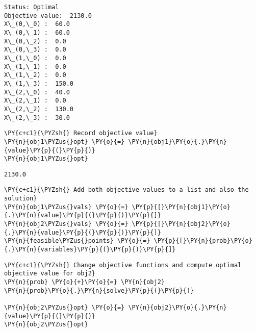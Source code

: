     \begin{Verbatim}[commandchars=\\\{\}]
Status: Optimal
Objective value:  2130.0
X\_(0,\_0) :  60.0
X\_(0,\_1) :  60.0
X\_(0,\_2) :  0.0
X\_(0,\_3) :  0.0
X\_(1,\_0) :  0.0
X\_(1,\_1) :  0.0
X\_(1,\_2) :  0.0
X\_(1,\_3) :  150.0
X\_(2,\_0) :  40.0
X\_(2,\_1) :  0.0
X\_(2,\_2) :  130.0
X\_(2,\_3) :  30.0
    \end{Verbatim}

    \begin{tcolorbox}[breakable, size=fbox, boxrule=1pt, pad at break*=1mm,colback=cellbackground, colframe=cellborder]
\begin{Verbatim}[commandchars=\\\{\}]
\PY{c+c1}{\PYZsh{} Record objective value}
\PY{n}{obj1\PYZus{}opt} \PY{o}{=} \PY{n}{obj1}\PY{o}{.}\PY{n}{value}\PY{p}{(}\PY{p}{)}
\PY{n}{obj1\PYZus{}opt}
\end{Verbatim}
\end{tcolorbox}

            \begin{tcolorbox}[breakable, size=fbox, boxrule=.5pt, pad at break*=1mm, opacityfill=0]
\begin{Verbatim}[commandchars=\\\{\}]
2130.0
\end{Verbatim}
\end{tcolorbox}
        
    \begin{tcolorbox}[breakable, size=fbox, boxrule=1pt, pad at break*=1mm,colback=cellbackground, colframe=cellborder]
\begin{Verbatim}[commandchars=\\\{\}]
\PY{c+c1}{\PYZsh{} Add both objective values to a list and also the solution}
\PY{n}{obj1\PYZus{}vals} \PY{o}{=} \PY{p}{[}\PY{n}{obj1}\PY{o}{.}\PY{n}{value}\PY{p}{(}\PY{p}{)}\PY{p}{]}
\PY{n}{obj2\PYZus{}vals} \PY{o}{=} \PY{p}{[}\PY{n}{obj2}\PY{o}{.}\PY{n}{value}\PY{p}{(}\PY{p}{)}\PY{p}{]}
\PY{n}{feasible\PYZus{}points} \PY{o}{=} \PY{p}{[}\PY{n}{prob}\PY{o}{.}\PY{n}{variables}\PY{p}{(}\PY{p}{)}\PY{p}{]}
\end{Verbatim}
\end{tcolorbox}

    \begin{tcolorbox}[breakable, size=fbox, boxrule=1pt, pad at break*=1mm,colback=cellbackground, colframe=cellborder]
\begin{Verbatim}[commandchars=\\\{\}]
\PY{c+c1}{\PYZsh{} Change objective functions and compute optimal objective value for obj2}
\PY{n}{prob} \PY{o}{+}\PY{o}{=} \PY{n}{obj2}
\PY{n}{prob}\PY{o}{.}\PY{n}{solve}\PY{p}{(}\PY{p}{)}

\PY{n}{obj2\PYZus{}opt} \PY{o}{=} \PY{n}{obj2}\PY{o}{.}\PY{n}{value}\PY{p}{(}\PY{p}{)}
\PY{n}{obj2\PYZus{}opt}
\end{Verbatim}
\end{tcolorbox}

